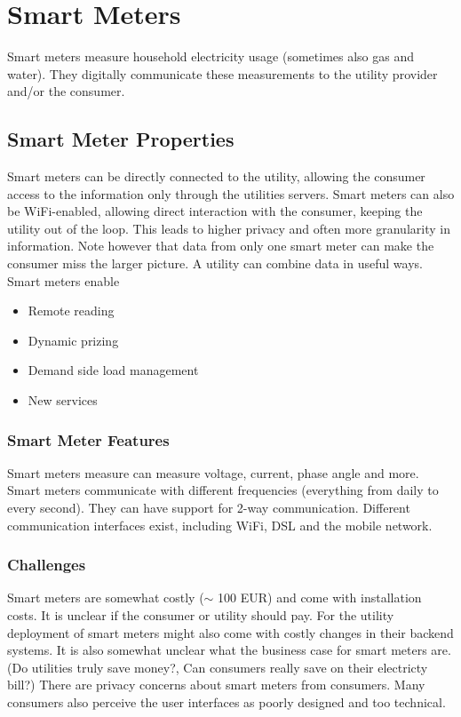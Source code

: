 \section{Smart Meters}
Smart meters measure household electricity usage (sometimes also gas and water).
They digitally communicate these measurements to the utility provider and/or the consumer.\\

\subsection{Smart Meter Properties}
Smart meters can be directly connected to the utility, allowing the consumer access to the information only through the utilities servers.
Smart meters can also be WiFi-enabled, allowing direct interaction with the consumer, keeping the utility out of the loop.
This leads to higher privacy and often more granularity in information.
Note however that data from only one smart meter can make the consumer miss the larger picture. A utility can combine data in useful ways.\\

Smart meters enable
\begin{itemize}
    \item Remote reading
    \item Dynamic prizing
    \item Demand side load management
    \item New services
\end{itemize}

\subsubsection{Smart Meter Features}
Smart meters measure can measure voltage, current, phase angle and more.
Smart meters communicate with different frequencies (everything from daily to every second).
They can have support for 2-way communication.
Different communication interfaces exist, including WiFi, DSL and the mobile network.

\subsubsection{Challenges}
Smart meters are somewhat costly ($\sim$ 100 EUR) and come with installation costs.
It is unclear if the consumer or utility should pay.
For the utility deployment of smart meters might also come with costly changes in their backend systems.
It is also somewhat unclear what the business case for smart meters are.
(Do utilities truly save money?, Can consumers really save on their electricty bill?)
There are privacy concerns about smart meters from consumers.
Many consumers also perceive the user interfaces as poorly designed and too technical.\\

